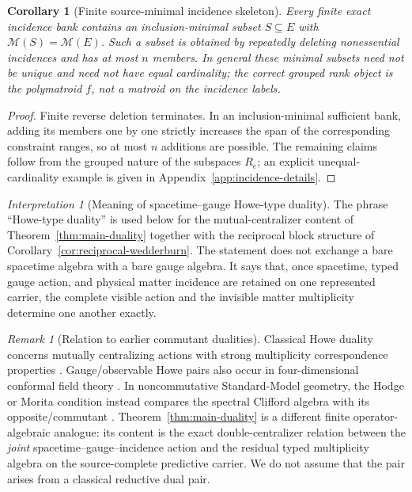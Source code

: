 \documentclass[11pt]{article}
\newtheorem{corollary}[theorem]{Corollary}
\theoremstyle{definition}
\theoremstyle{remark}
\newtheorem{remark}[theorem]{Remark}
\newtheorem{interpretation}[theorem]{Interpretation}
\newcommand{\M}{\mathcal M}
\begin{document}
\begin{corollary}[Finite source-minimal incidence skeleton]
\label{cor:minimal-incidence-skeleton}
Every finite exact incidence bank contains an inclusion-minimal subset
$S\subseteq E$ with $\M(S)=\M(E)$.  Such a subset is obtained by repeatedly
deleting nonessential incidences and has at most $n$ members.  In general
these minimal subsets need not be unique and need not have equal cardinality;
the correct grouped rank object is the polymatroid $f$, not a matroid on the
incidence labels.
\end{corollary}

\begin{proof}
Finite reverse deletion terminates.  In an inclusion-minimal sufficient bank,
adding its members one by one strictly increases the span of the corresponding
constraint ranges, so at most $n$ additions are possible.  The remaining
claims follow from the grouped nature of the subspaces $R_e$; an explicit
unequal-cardinality example is given in Appendix~\ref{app:incidence-details}.
\end{proof}

\begin{interpretation}[Meaning of spacetime--gauge Howe-type duality]
The phrase ``Howe-type duality'' is used below for the mutual-centralizer
content of Theorem~\ref{thm:main-duality} together with the reciprocal block
structure of Corollary~\ref{cor:reciprocal-wedderburn}.  The statement does not
exchange a bare spacetime algebra with a bare gauge algebra.  It says that,
once spacetime, typed gauge action, and physical matter incidence are retained
on one represented carrier, the complete visible action and the invisible
matter multiplicity determine one another exactly.
\end{interpretation}

\begin{remark}[Relation to earlier commutant dualities]
Classical Howe duality concerns mutually centralizing actions with strong
multiplicity correspondence properties \cite{Howe1989}.  Gauge/observable
Howe pairs also occur in four-dimensional conformal field theory
\cite{Todorov2010}.  In noncommutative Standard-Model geometry, the Hodge or
Morita condition instead compares the spectral Clifford algebra with its
opposite/commutant \cite{DAndreaDabrowski2016,DabrowskiDAndreaSitarz2018}.
Theorem~\ref{thm:main-duality} is a different finite operator-algebraic
analogue: its content is the exact double-centralizer relation between the
\emph{joint} spacetime--gauge--incidence action and the residual typed
multiplicity algebra on the source-complete predictive carrier.  We do not
assume that the pair arises from a classical reductive dual pair.
\end{remark}
\end{document}
